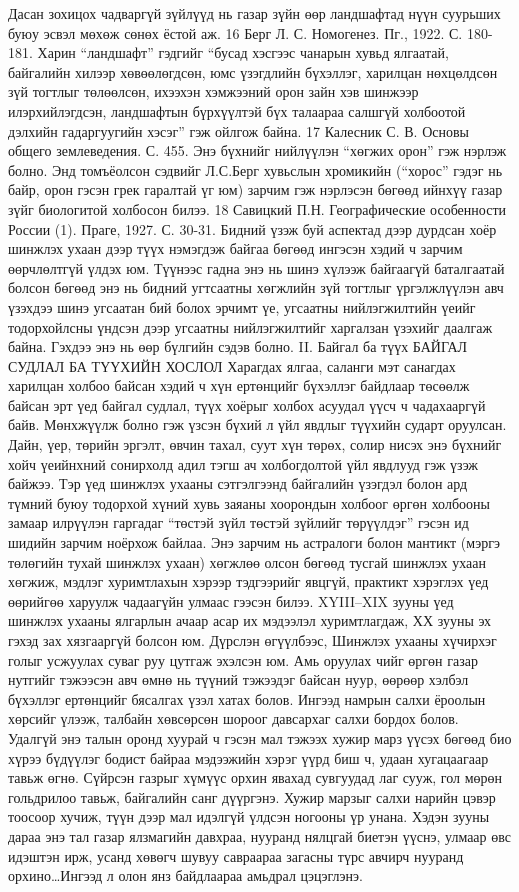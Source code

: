 Дасан зохицох чадваргүй зүйлүүд нь газар зүйн өөр ландшафтад нүүн суурьших буюу эсвэл мөхөж сөнөх ёстой аж.
16 Берг Л. С. Номогенез. Пг., 1922. С. 180-181.
Харин “ландшафт” гэдгийг “бусад хэсгээс чанарын хувьд ялгаатай, байгалийн хилээр хөвөөлөгдсөн, юмс үзэгдлийн бүхэллэг, харилцан нөхцөлдсөн зүй тогтлыг төлөөлсөн, ихээхэн хэмжээний орон зайн хэв шинжээр илэрхийлэгдсэн, ландшафтын бүрхүүлтэй бүх талаараа салшгүй холбоотой дэлхийн гадаргуугийн хэсэг” гэж ойлгож байна.
17 Калесник С. В. Основы общего землеведения. С. 455.
Энэ бүхнийг нийлүүлэн “хөгжих орон” гэж нэрлэж болно. Энд томъёолсон сэдвийг Л.С.Берг хувьслын хромикийн (“хорос” гэдэг нь байр, орон гэсэн грек гаралтай үг юм) зарчим гэж нэрлэсэн бөгөөд ийнхүү газар зүйг биологитой холбосон билээ.
18 Савицкий П.Н. Географические особенности России (1). Праге, 1927. С. 30-31.
Бидний үзэж буй аспектад дээр дурдсан хоёр шинжлэх ухаан дээр түүх нэмэгдэж байгаа бөгөөд ингэсэн хэдий ч зарчим өөрчлөлтгүй үлдэх юм. Түүнээс гадна энэ нь шинэ хүлээж байгаагүй баталгаатай болсон бөгөөд энэ нь бидний угтсаатны хөгжлийн зүй тогтлыг үргэлжлүүлэн авч үзэхдээ шинэ угсаатан бий болох эрчимт үе, угсаатны нийлэгжилтийн үеийг тодорхойлсны үндсэн дээр угсаатны нийлэгжилтийг харгалзан үзэхийг даалгаж байна. Гэхдээ энэ нь өөр бүлгийн сэдэв болно.
II. Байгал ба түүх
БАЙГАЛ СУДЛАЛ БА ТҮҮХИЙН ХОСЛОЛ
Харагдах ялгаа, саланги мэт санагдах харилцан холбоо байсан хэдий ч хүн ертөнцийг бүхэллэг байдлаар төсөөлж байсан эрт үед байгал судлал, түүх хоёрыг холбох асуудал үүсч ч чадахааргүй байв. Мөнхжүүлж болно гэж үзсэн бүхий л үйл явдлыг түүхийн сударт оруулсан. Дайн, үер, төрийн эргэлт, өвчин тахал, суут хүн төрөх, солир нисэх энэ бүхнийг хойч үеийнхний сонирхолд адил тэгш ач холбогдолтой үйл явдлууд гэж үзэж байжээ. Тэр үед шинжлэх ухааны сэтгэлгээнд байгалийн үзэгдэл болон ард түмний буюу тодорхой хүний хувь заяаны хоорондын холбоог өргөн холбооны замаар илрүүлэн гаргадаг “төстэй зүйл төстэй зүйлийг төрүүлдэг” гэсэн ид шидийн зарчим ноёрхож байлаа. Энэ зарчим нь астралоги болон мантикт (мэргэ төлөгийн тухай шинжлэх ухаан) хөгжлөө олсон бөгөөд тусгай шинжлэх ухаан хөгжиж, мэдлэг хуримтлахын хэрээр тэдгээрийг явцгүй, практикт хэрэглэх үед өөрийгөө харуулж чадаагүйн улмаас гээсэн билээ.
XYIII–XIX зууны үед шинжлэх ухааны ялгарлын ачаар асар их мэдээлэл хуримтлагдаж, ХХ зууны эх гэхэд зах хязгааргүй болсон юм. Дүрслэн өгүүлбээс, Шинжлэх ухааны хүчирхэг голыг усжуулах суваг руу цутгаж эхэлсэн юм. Амь оруулах чийг өргөн газар нутгийг тэжээсэн авч өмнө нь түүний тэжээдэг байсан нуур, өөрөөр хэлбэл бүхэллэг ертөнцийг бясалгах үзэл хатах болов. Ингээд намрын салхи ёроолын хөрсийг үлээж, талбайн хөвсөрсөн шороог давсархаг салхи бордох болов. Удалгүй энэ талын оронд хуурай ч гэсэн мал тэжээх хужир марз үүсэх бөгөөд био хүрээ бүдүүлэг бодист байраа мэдээжийн хэрэг үүрд биш ч, удаан хугацаагаар тавьж өгнө. Сүйрсэн газрыг хүмүүс орхин явахад сувгуудад лаг сууж, гол мөрөн гольдрилоо тавьж, байгалийн санг дүүргэнэ. Хужир марзыг салхи нарийн цэвэр тоосоор хучиж, түүн дээр мал идэлгүй үлдсэн ногооны үр унана. Хэдэн зууны дараа энэ тал газар ялзмагийн давхраа, нууранд нялцгай биетэн үүснэ, улмаар өвс идэштэн ирж, усанд хөвөгч шувуу савраараа загасны түрс авчирч нууранд орхино…Ингээд л олон янз байдлаараа амьдрал цэцэглэнэ.
